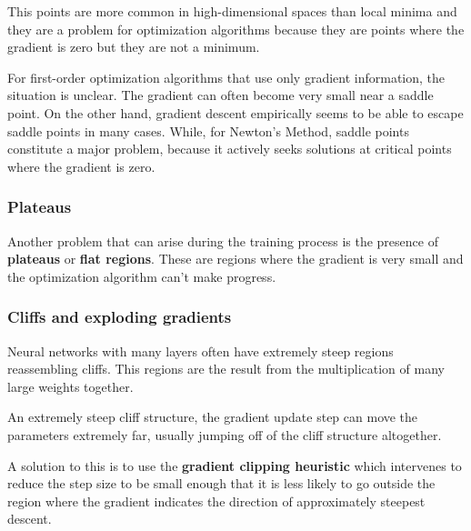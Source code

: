 This points are more common in high-dimensional spaces than local minima and they
are a problem for optimization algorithms because they are points where the gradient
is zero but they are not a minimum.

For first-order optimization algorithms that use only gradient information, the
situation is unclear. The gradient can often become very small near a saddle point.
On the other hand, gradient descent empirically seems to be able to escape saddle
points in many cases. While, for Newton's Method, saddle points constitute a
major problem, because it actively seeks solutions at critical points where the
gradient is zero.
\subsubsection{Plateaus}
Another problem that can arise during the training process is the presence of
\textbf{plateaus} or \textbf{flat regions}. These are regions where the gradient
is very small and the optimization algorithm can't make progress.
\subsubsection{Cliffs and exploding gradients}
Neural networks with many layers often have extremely steep regions reassembling
cliffs. This regions are the result from the multiplication of many large weights
together.

An extremely steep cliff structure, the gradient update step can move the
parameters extremely far, usually jumping off of the cliff structure altogether.

A solution to this is to use the \textbf{gradient clipping heuristic} which
intervenes to reduce the step size to be small enough that it is less likely to
go outside the region where the gradient indicates the direction of approximately
steepest descent.
